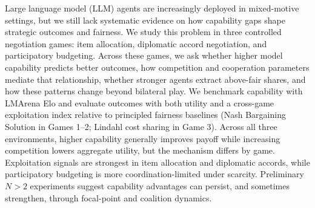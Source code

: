 Large language model (LLM) agents are increasingly deployed in mixed-motive settings, but we still lack systematic evidence on how capability gaps shape strategic outcomes and fairness. We study this problem in three controlled negotiation games: item allocation, diplomatic accord negotiation, and participatory budgeting. Across these games, we ask whether higher model capability predicts better outcomes, how competition and cooperation parameters mediate that relationship, whether stronger agents extract above-fair shares, and how these patterns change beyond bilateral play. We benchmark capability with LMArena Elo and evaluate outcomes with both utility and a cross-game exploitation index relative to principled fairness baselines (Nash Bargaining Solution in Games 1--2; Lindahl cost sharing in Game 3). Across all three environments, higher capability generally improves payoff while increasing competition lowers aggregate utility, but the mechanism differs by game. Exploitation signals are strongest in item allocation and diplomatic accords, while participatory budgeting is more coordination-limited under scarcity. Preliminary $N > 2$ experiments suggest capability advantages can persist, and sometimes strengthen, through focal-point and coalition dynamics.
